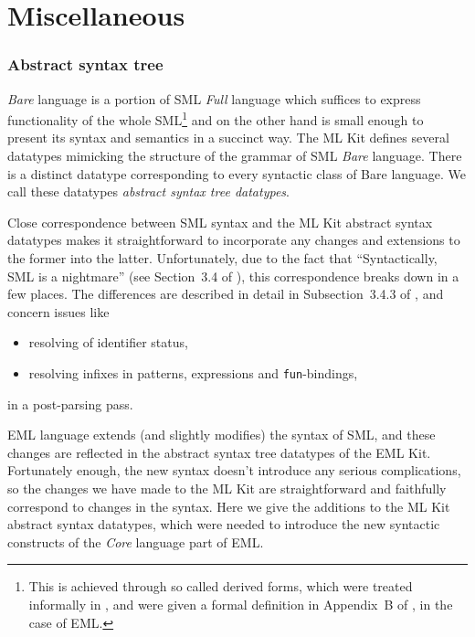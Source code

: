 \part{Miscellaneous}
\label{sec:misc}

\section{Abstract syntax tree}
\label{sec:ast}

{\em Bare} language is a portion of SML {\em Full} language which suffices
to express functionality of the whole SML\footnote{This is achieved 
through so called derived forms, which were treated informally
in \cite{MTH90}, and were given a formal definition in 
Appendix~B of \cite{bib:KST94}, in the case of EML.}
and on the other hand
is small enough to present its syntax and semantics in a succinct way.
The ML Kit defines several datatypes mimicking the structure of the 
grammar of SML {\em Bare} language.
There is a distinct datatype corresponding to every syntactic class of 
Bare language. We call these datatypes {\em abstract syntax tree datatypes}.

Close correspondence between SML syntax and the ML Kit abstract syntax 
datatypes makes it straightforward to incorporate any changes and extensions
to the former into the latter.
Unfortunately, due to the fact that ``Syntactically, SML is a 
nightmare'' (see Section~3.4 of \cite{BRTT93}), this correspondence breaks 
down in a few places. The differences are described in detail in 
Subsection~3.4.3 of \cite{BRTT93}, and concern issues like 
\begin{itemize}
  \item resolving of identifier status,
  \item resolving infixes in patterns, expressions and {\tt fun}-bindings,
\end{itemize}
in a post-parsing pass.

EML language extends (and slightly modifies) the syntax of SML, and these 
changes are reflected in the abstract syntax tree datatypes of the EML Kit.
Fortunately enough, the new syntax doesn't introduce any serious
complications, so the changes we have made to the ML Kit are
straightforward and faithfully correspond to changes in the syntax.
Here we give the additions to the ML Kit abstract syntax 
datatypes, which were needed to introduce the new syntactic constructs 
of the {\em Core} language part of EML.

